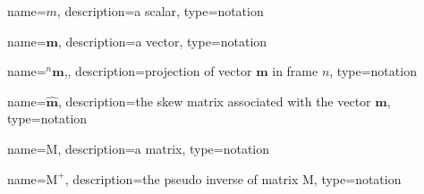 
	{%
		name=\ensuremath{m},
		description=a scalar,
		type=notation
	}

	\renewcommand{\vec}[1]{\ensuremath{\boldsymbol{#1}}}
	{%
		name=\vec{m},
		description=a vector,
		type=notation
	}

	\newcommand{\project}[2]{\ensuremath{{}^{#2}\!{#1}}}
	{%
		name=\project{\vec{m}}{n},,
		description=projection of vector \vec{m} in frame $n$,
		type=notation
	}

	\newcommand{\skewmat}[1]{\ensuremath{\widehat{#1}}}
	{%
		name=\skewmat{\vec{m}},
		description=the skew matrix associated with the vector \vec{m},
		type=notation
	}

	\newcommand{\mat}[1]{\ensuremath{\boldsymbol{\mathrm{#1}}}}
	{%
		name=\mat{M},
		description=a matrix,
		type=notation
	}

	\newcommand{\pseudoinv}[1]{\ensuremath{{#1}^{+}}}
	{%
		name=\pseudoinv{\mat{M}},
		description=the pseudo inverse of matrix \mat{M},
		type=notation
	}


